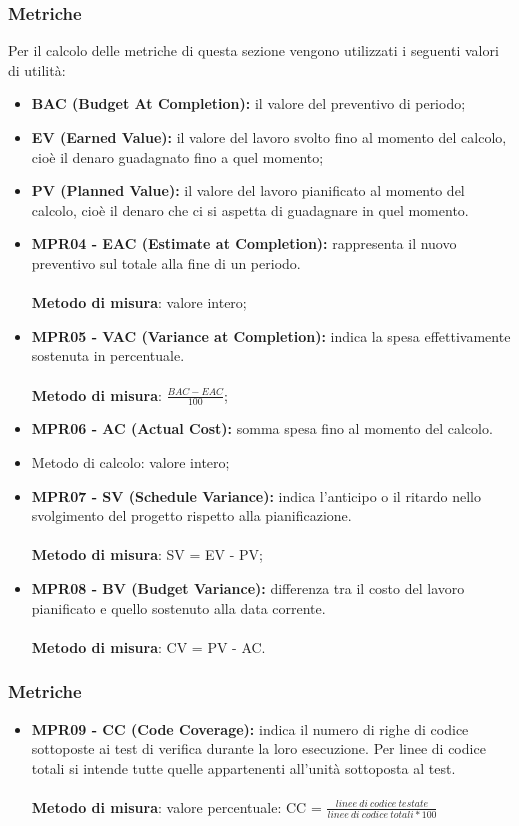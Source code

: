 \subsubsection{Metriche}
Per il calcolo delle metriche di questa sezione vengono utilizzati i seguenti valori di utilità:
\begin{itemize}
    \item \textbf{BAC (Budget At Completion):} il valore del preventivo di periodo;
    \item \textbf{EV (Earned Value):}  il valore del lavoro svolto fino al momento del calcolo, cioè il denaro guadagnato fino a quel momento;
    \item \textbf{PV (Planned Value):} il valore del lavoro pianificato al momento del calcolo, cioè il denaro che ci si aspetta di guadagnare in quel momento.
\end{itemize}
\begin{itemize}
    \item \textbf{MPR04 - EAC (Estimate at Completion):} rappresenta il nuovo preventivo sul totale alla fine di un periodo.\\
    \\\textbf{Metodo di misura}: valore intero;
    \item \textbf{MPR05 - VAC (Variance at Completion):} indica la spesa effettivamente sostenuta in percentuale.\\
    \\\textbf{Metodo di misura}: $\frac{BAC - EAC}{100}$;
    \item \textbf{MPR06 - AC (Actual Cost):} somma spesa fino al momento del calcolo.\\
    \item Metodo di calcolo: valore intero;
    \item \textbf{MPR07 - SV (Schedule Variance):} indica l'anticipo o il ritardo nello svolgimento del progetto rispetto alla pianificazione.\\
    \\\textbf{Metodo di misura}: SV = EV - PV;
    \item \textbf{MPR08 - BV (Budget Variance):} differenza tra il costo del lavoro pianificato e quello sostenuto alla data corrente.\\
    \\\textbf{Metodo di misura}: CV = PV - AC.
\end{itemize}

\subsubsection{Metriche}
\begin{itemize}
    \item \textbf{MPR09 - CC (Code Coverage):} indica il numero di righe di codice sottoposte ai test di verifica durante la loro esecuzione. Per linee di codice totali
    si intende tutte quelle appartenenti all'unità sottoposta al test.\\
    \\\textbf{Metodo di misura}: valore percentuale: CC = $\frac{linee \ di \ codice \ testate}{linee \ di \ codice \ totali * 100}$
\end{itemize}

